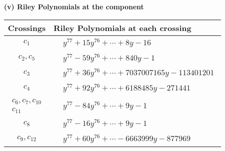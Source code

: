 \documentclass[1p]{elsarticle_modified}
\theoremstyle{definition}
\begin{document}
\newpage\renewcommand{\arraystretch}{1}
\flushleft \textbf{(v) Riley Polynomials at the component}\newline \\
\begin{tabular}{m{50pt}|m{274pt}}
Crossings & \hspace{64pt}Riley Polynomials at each crossing \\
\hline $$\begin{aligned}c_{1}\end{aligned}$$&$\begin{aligned}
&y^{77}+15 y^{76}+\cdots+8 y-16
\end{aligned}$\\
\hline $$\begin{aligned}c_{2},c_{5}\end{aligned}$$&$\begin{aligned}
&y^{77}-59 y^{76}+\cdots+840 y-1
\end{aligned}$\\
\hline $$\begin{aligned}c_{3}\end{aligned}$$&$\begin{aligned}
&y^{77}+36 y^{76}+\cdots+7037007165 y-113401201
\end{aligned}$\\
\hline $$\begin{aligned}c_{4}\end{aligned}$$&$\begin{aligned}
&y^{77}+92 y^{76}+\cdots+6188485 y-271441
\end{aligned}$\\
\hline $$\begin{aligned}c_{6},c_{7},c_{10}\\c_{11}\end{aligned}$$&$\begin{aligned}
&y^{77}-84 y^{76}+\cdots+9 y-1
\end{aligned}$\\
\hline $$\begin{aligned}c_{8}\end{aligned}$$&$\begin{aligned}
&y^{77}-16 y^{76}+\cdots+9 y-1
\end{aligned}$\\
\hline $$\begin{aligned}c_{9},c_{12}\end{aligned}$$&$\begin{aligned}
&y^{77}+60 y^{76}+\cdots-6663999 y-877969
\end{aligned}$\\
\hline
\end{tabular}\\~\\
\end{document}
